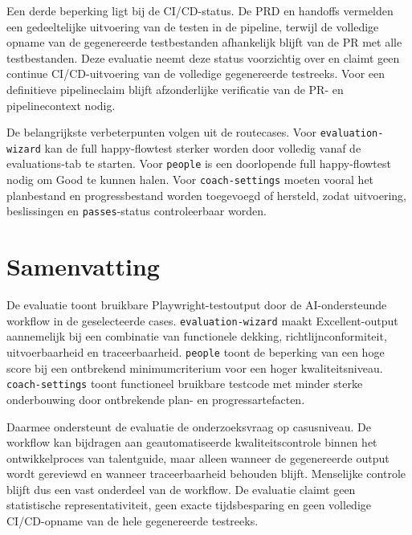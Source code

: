 Een derde beperking ligt bij de CI/CD-status. De PRD en handoffs vermelden een gedeeltelijke uitvoering van de testen in de pipeline, terwijl de volledige opname van de gegenereerde testbestanden afhankelijk blijft van de PR met alle testbestanden. Deze evaluatie neemt deze status voorzichtig over en claimt geen continue CI/CD-uitvoering van de volledige gegenereerde testreeks. Voor een definitieve pipelineclaim blijft afzonderlijke verificatie van de PR- en pipelinecontext nodig.

De belangrijkste verbeterpunten volgen uit de routecases. Voor \texttt{evaluation-wizard} kan de full happy-flowtest sterker worden door volledig vanaf de evaluations-tab te starten. Voor \texttt{people} is een doorlopende full happy-flowtest nodig om Good te kunnen halen. Voor \texttt{coach-settings} moeten vooral het planbestand en progressbestand worden toegevoegd of hersteld, zodat uitvoering, beslissingen en \texttt{passes}-status controleerbaar worden.

\section{Samenvatting}

De evaluatie toont bruikbare Playwright-testoutput door de AI-ondersteunde workflow in de geselecteerde cases. \texttt{evaluation-wizard} maakt Excellent-output aannemelijk bij een combinatie van functionele dekking, richtlijnconformiteit, uitvoerbaarheid en traceerbaarheid. \texttt{people} toont de beperking van een hoge score bij een ontbrekend minimumcriterium voor een hoger kwaliteitsniveau. \texttt{coach-settings} toont functioneel bruikbare testcode met minder sterke onderbouwing door ontbrekende plan- en progressartefacten.

Daarmee ondersteunt de evaluatie de onderzoeksvraag op casusniveau. De workflow kan bijdragen aan geautomatiseerde kwaliteitscontrole binnen het ontwikkelproces van talentguide, maar alleen wanneer de gegenereerde output wordt gereviewd en wanneer traceerbaarheid behouden blijft. Menselijke controle blijft dus een vast onderdeel van de workflow. De evaluatie claimt geen statistische representativiteit, geen exacte tijdsbesparing en geen volledige CI/CD-opname van de hele gegenereerde testreeks.
